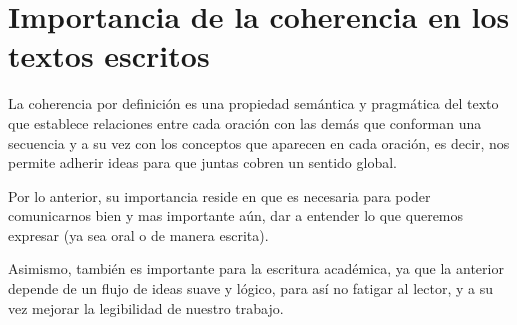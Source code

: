 \documentclass[letterpaper, 12pt]{report}
\begin{document}






\chapter*{Importancia de la coherencia en los textos escritos}

La coherencia por definición es una propiedad semántica y pragmática del texto
que establece relaciones entre cada oración con las demás que conforman una
secuencia y a su vez con los conceptos que aparecen en cada oración, es decir,
nos permite adherir ideas para que juntas cobren un sentido global.

\vspace{.5cm}

Por lo anterior, su importancia reside en que es necesaria para poder
comunicarnos bien y mas importante aún, dar a entender lo que queremos
expresar (ya sea oral o de manera escrita).

\vspace{.5cm}

Asimismo, también es importante para la escritura académica, ya que la anterior
depende de un flujo de ideas suave y lógico, para así no
fatigar al lector, y a su vez mejorar la legibilidad de nuestro trabajo.
~\cite{ImportanciaCoherencia}

\newpage


\end{document}
